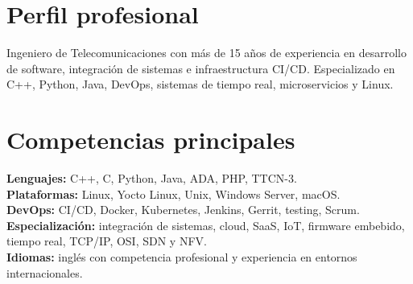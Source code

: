 \documentclass[10pt,a4paper]{article}
\begin{document}
\ATSSetup
{}

\section{Perfil profesional}
Ingeniero de Telecomunicaciones con más de 15 años de experiencia en desarrollo de software, integración de sistemas e infraestructura CI/CD. Especializado en C++, Python, Java, DevOps, sistemas de tiempo real, microservicios y Linux.

\section{Competencias principales}
\textbf{Lenguajes:} C++, C, Python, Java, ADA, PHP, TTCN-3.\\
\textbf{Plataformas:} Linux, Yocto Linux, Unix, Windows Server, macOS.\\
\textbf{DevOps:} CI/CD, Docker, Kubernetes, Jenkins, Gerrit, testing, Scrum.\\
\textbf{Especialización:} integración de sistemas, cloud, SaaS, IoT, firmware embebido, tiempo real, TCP/IP, OSI, SDN y NFV.\\
\textbf{Idiomas:} inglés con competencia profesional y experiencia en entornos internacionales.
\end{document}
